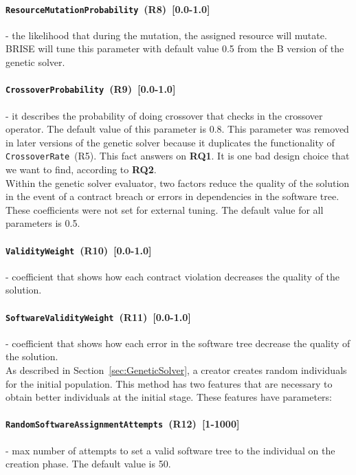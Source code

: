 \paragraph{\texttt{ResourceMutationProbability}~(R8)~[0.0-1.0]} - the likelihood that during the mutation, the assigned resource will mutate. BRISE will tune this parameter with default value 0.5 from the B version of the genetic solver.
\paragraph{\texttt{CrossoverProbability}~(R9)~[0.0-1.0]} - it describes the probability of doing crossover that checks in the crossover operator. The default value of this parameter is 0.8. This parameter was removed in later versions of the genetic solver because it duplicates the functionality of \texttt{CrossoverRate}~(R5). This fact answers on \textbf{RQ1}. It is one bad design choice that we want to find, according to \textbf{RQ2}.\\ 


Within the genetic solver evaluator, two factors reduce the quality of the solution in the event of a contract breach or errors in dependencies in the software tree. These coefficients were not set for external tuning. The default value for all parameters is 0.5.
\paragraph{\texttt{ValidityWeight}~(R10)~[0.0-1.0]} - coefficient that shows how each contract violation decreases the quality of the solution.
\paragraph{\texttt{SoftwareValidityWeight}~(R11)~[0.0-1.0]} - coefficient that shows how each error in the software tree decrease the quality of the solution.\\

As described in Section~\ref{sec:GeneticSolver}, a creator creates random individuals for the initial population.
This method has two features that are necessary to obtain better individuals at the initial stage. These features have parameters:
\paragraph{\texttt{RandomSoftwareAssignmentAttempts}~(R12)~[1-1000]} - max number of attempts to set a valid software tree to the individual on the creation phase. The default value is 50.
